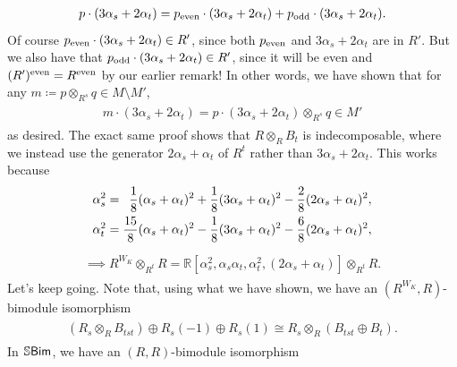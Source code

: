 \begin{example}
\begin{align*}
\begin{split}
p\cdot (3\alpha_s + 2\alpha_t) = p_\textup{even}\cdot (3\alpha_s + 2\alpha_t) + p_\textup{odd}\cdot (3\alpha_s + 2\alpha_t).
\end{split}
\end{align*}
\noindent Of course $p_\textup{even}\cdot (3\alpha_s + 2\alpha_t) \in R'$, since both $p_\textup{even}$ and $3\alpha_s + 2\alpha_t$ are in $R'$. But we also have that $p_\textup{odd}\cdot (3\alpha_s + 2\alpha_t) \in R'$, since it will be even and $(R')^\textup{even} = R^\textup{even}$ by our earlier remark! In other words, we have shown that for any $m \coloneqq p \otimes_{R^s} q \in M\setminus M'$,
\begin{align*}
\begin{split}
m \cdot (3\alpha_s + 2\alpha_t) = p\cdot (3\alpha_s + 2\alpha_t) \otimes_{R^s} q \in M'
\end{split}
\end{align*}
\noindent as desired. The exact same proof shows that $R \otimes_R B_t$ is indecomposable, where we instead use the generator $2\alpha_s+\alpha_t$ of $R^t$ rather than $3\alpha_s+2\alpha_t$. This works because
\begin{align*}
\begin{split}
\alpha_s^2 &= \hphantom{\frac{15}{8}}\nhphantom{$\displaystyle\frac{1}{8}$}\frac{1}{8}(\alpha_s+\alpha_t)^2 + \frac{1}{8}(3\alpha_s+\alpha_t)^2 - \frac{2}{8}(2\alpha_s+\alpha_t)^2,\\
\alpha_t^2 &= \frac{15}{8}(\alpha_s+\alpha_t)^2 - \frac{1}{8}(3\alpha_s+\alpha_t)^2 - \frac{6}{8}(2\alpha_s+\alpha_t)^2,
\end{split}
\end{align*}
\begin{align*}
\begin{split}
\implies R^{W_K} \otimes_{R^t} R = \mathbb{R}[\alpha_s^2, \alpha_s\alpha_t, \alpha_t^2, (2\alpha_s + \alpha_t)] \otimes_{R^t} R.
\end{split}
\end{align*}
\noindent Let's keep going. Note that, using what we have shown, we have an $(R^{W_K}, R)$-bimodule isomorphism
\begin{align*}
\begin{split}
(R_s \otimes_R B_{tst}) \oplus R_s(-1) \oplus R_s(1) \cong R_s \otimes_R (B_{tst} \oplus B_t).
\end{split}
\end{align*}
\noindent In $\mathbb{S}\textnormal{\textsf{Bim}}$, we have an $(R, R)$-bimodule isomorphism

\end{example}
